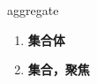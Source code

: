 
\begin{frame}
{\huge aggregate}
\begin{center}
\begin{enumerate}\Large
  \item \textbf{集合体}
  \item \textbf{集合，聚焦}
\end{enumerate}
\end{center}
\end{frame}
